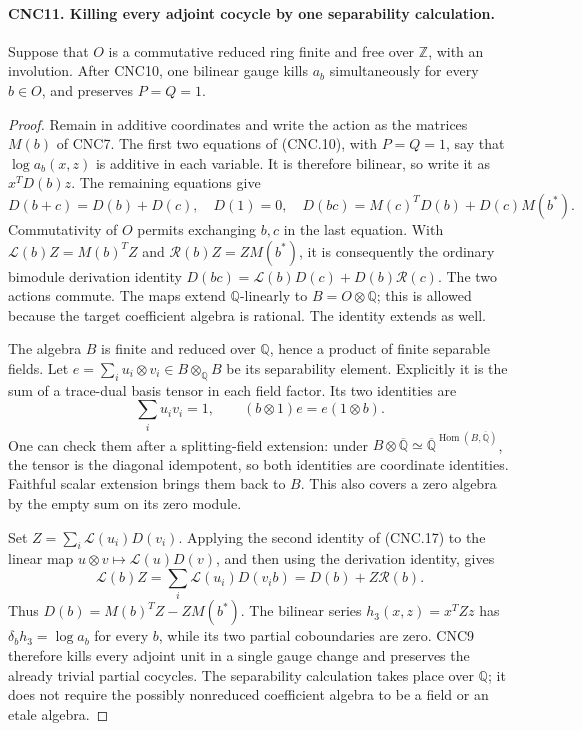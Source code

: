 \documentclass[11pt,a4paper]{article}
\numberwithin{equation}{section}
\theoremstyle{remark}\newtheorem{remark}[theorem]{Remark}
\begin{document}
\paragraph{CNC11. Killing every adjoint cocycle by one separability calculation.}
\label{claim:CNC11}
Suppose that \(O\) is a commutative reduced ring finite and free over
\(\mathbb Z\), with an involution.  After CNC10, one bilinear gauge
kills \(a_b\) simultaneously for every \(b\in O\), and preserves
\(P=Q=1\).
\begin{proof}
Remain in additive coordinates and write the action as the matrices
\(M(b)\) of CNC7.  The first two equations of (CNC.10), with
\(P=Q=1\), say that \(\log a_b(x,z)\) is additive in each
variable.  It is therefore bilinear, so write it as \(x^TD(b)z\).
The remaining equations give
\[
 D(b+c)=D(b)+D(c),\quad D(1)=0,\quad
 D(bc)=M(c)^TD(b)+D(c)M(b^*).                                 \tag{CNC.16}
\]
Commutativity of \(O\) permits exchanging \(b,c\) in the last
equation.  With
\(\mathcal L(b)Z=M(b)^TZ\) and
\(\mathcal R(b)Z=ZM(b^*)\), it is consequently the ordinary
bimodule derivation identity
\(D(bc)=\mathcal L(b)D(c)+D(b)\mathcal R(c)\).
The two actions commute.  The maps extend \(\mathbb Q\)-linearly
to \(B=O\otimes\mathbb Q\); this is allowed because the target
coefficient algebra is rational.  The identity extends as well.

The algebra \(B\) is finite and reduced over \(\mathbb Q\), hence
a product of finite separable fields.  Let
\(e=\sum_i u_i\otimes v_i\in B\otimes_{\mathbb Q}B\)
be its separability element.  Explicitly it is the sum of a trace-dual
basis tensor in each field factor.  Its two identities are
\[
 \sum_i u_iv_i=1,\qquad
 (b\otimes1)e=e(1\otimes b).                                 \tag{CNC.17}
\]
One can check them after a splitting-field extension: under
\(B\otimes\overline{\mathbb Q}\simeq
\overline{\mathbb Q}^{\operatorname{Hom}(B,\overline{\mathbb Q})}\),
the tensor is the diagonal idempotent, so both identities are coordinate
identities.  Faithful scalar extension brings them back to \(B\).
This also covers a zero algebra by the empty sum on its zero module.

Set \(Z=\sum_i\mathcal L(u_i)D(v_i)\).  Applying the second
identity of (CNC.17) to the linear map
\(u\otimes v\mapsto\mathcal L(u)D(v)\), and then using the
derivation identity, gives
\[
 \mathcal L(b)Z
 =\sum_i\mathcal L(u_i)D(v_ib)
 =D(b)+Z\mathcal R(b).
\]
Thus \(D(b)=M(b)^TZ-ZM(b^*)\).
The bilinear series \(h_3(x,z)=x^TZz\) has
\(\delta_bh_3=\log a_b\) for every \(b\), while its two
partial coboundaries are zero.  CNC9 therefore kills every adjoint
unit in a single gauge change and preserves the already trivial
partial cocycles.  The separability calculation takes place over
\(\mathbb Q\); it does not require the possibly nonreduced
coefficient algebra to be a field or an etale algebra.
\end{proof}
\end{document}
